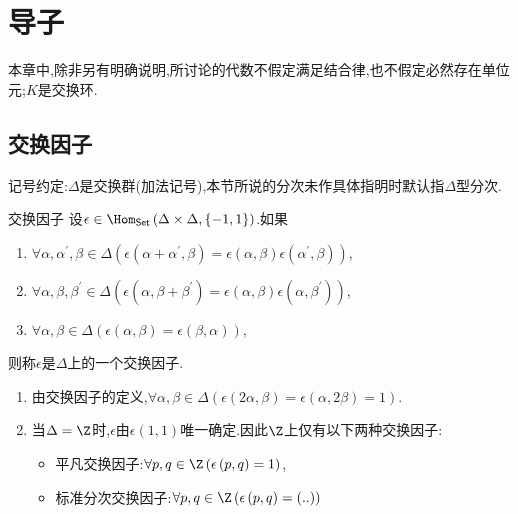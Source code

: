 \chapter{导子}

本章中,除非另有明确说明,所讨论的代数不假定满足结合律,也不假定必然存在单位元;$K$是交换环.

\section{交换因子}

记号约定:$\Delta$是交换群(加法记号),本节所说的分次未作具体指明时默认指$\Delta$型分次.

\begin{definition}{交换因子}{}
	设$\epsilon\in\Hom_{\mathsf{Set}}\left(\Delta\times\Delta,\left\{-1,1\right\}\right)$.如果
	\begin{enumerate}
		\item $\forall\alpha,\alpha^{\prime},\beta\in\Delta\left(\epsilon\left(\alpha+\alpha^{\prime},\beta\right)=\epsilon\left(\alpha,\beta\right)\epsilon\left(\alpha^{\prime}, \beta\right)\right)$,
		\item $\forall\alpha,\beta,\beta^{\prime}\in\Delta\left(\epsilon\left(\alpha,\beta+\beta^{\prime}\right)=\epsilon\left(\alpha,\beta\right)\epsilon\left(\alpha,\beta^{\prime}\right)\right)$,
		\item $\forall\alpha,\beta\in\Delta\left(\epsilon\left(\alpha,\beta\right)=\epsilon\left(\beta,\alpha\right)\right)$,
	\end{enumerate}
	则称$\epsilon$是$\Delta$上的一个交换因子.
\end{definition}

\begin{remark}{}{}
	\begin{enumerate}
		\item 由交换因子的定义,$\forall\alpha,\beta\in\Delta\left(\epsilon\left(2\alpha,\beta\right)=\epsilon\left(\alpha,2\beta\right)=1\right)$.
		\item 当$\Delta=\Z$时,$\epsilon$由$\epsilon\left(1,1\right)$唯一确定.因此$\Z$上仅有以下两种交换因子:
		\begin{itemize}
			\item 平凡交换因子:$\forall p,q\in\Z\left(\epsilon\left(p,q\right)=1\right)$,
			\item 标准分次交换因子:$\forall p,q\in\Z\left(\epsilon\left(p,q\right)=\left(..\right)\right)$
		\end{itemize}
	\end{enumerate}
\end{remark}